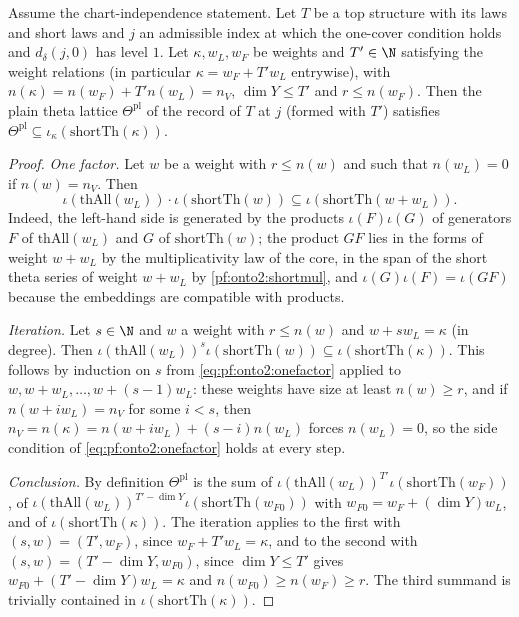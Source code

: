 \begin{proposition}\label{pf:onto2:prodshort}
Assume the chart-independence statement. Let $T$ be a top structure with its laws and short laws and $j$ an admissible index at
which the one-cover condition holds and $d_\delta(j,0)$ has level $1$. Let $\kappa,w_L,w_F$ be weights and $T'\in\N$ satisfying the weight relations (in particular
$\kappa=w_F+T'w_L$ entrywise), with $n(\kappa)=n(w_F)+T'n(w_L)=n_V$, $\dim Y\le T'$ and $r\le n(w_F)$. Then the plain theta lattice
$\Theta^{\mathrm{pl}}$ of the record of $T$ at $j$ (formed with $T'$) satisfies $\Theta^{\mathrm{pl}}\subseteq\iota_\kappa(\mathrm{shortTh}(\kappa))$.
\end{proposition}

\begin{proof}
\emph{One factor.} Let $w$ be a weight with $r\le n(w)$ and such that $n(w_L)=0$ if $n(w)=n_V$. Then
\begin{equation}\label{eq:pf:onto2:onefactor}
\iota(\mathrm{thAll}(w_L))\cdot\iota(\mathrm{shortTh}(w))\subseteq\iota(\mathrm{shortTh}(w+w_L)).
\end{equation}
Indeed, the left-hand side is generated by the products $\iota(F)\iota(G)$ of generators $F$ of $\mathrm{thAll}(w_L)$ and $G$ of
$\mathrm{shortTh}(w)$; the product $GF$ lies in the forms of weight $w+w_L$ by the multiplicativity law of the core, in the span of
the short theta series of weight $w+w_L$ by \cref{pf:onto2:shortmul}, and $\iota(G)\iota(F)=\iota(GF)$ because the embeddings are
compatible with products.

\emph{Iteration.} Let $s\in\N$ and $w$ a weight with $r\le n(w)$ and $w+sw_L=\kappa$ (in degree). Then
$\iota(\mathrm{thAll}(w_L))^s\iota(\mathrm{shortTh}(w))\subseteq\iota(\mathrm{shortTh}(\kappa))$. This follows by induction on $s$
from \eqref{eq:pf:onto2:onefactor} applied to $w,w+w_L,\dots,w+(s-1)w_L$: these weights have size at least $n(w)\ge r$, and if
$n(w+iw_L)=n_V$ for some $i<s$, then $n_V=n(\kappa)=n(w+iw_L)+(s-i)n(w_L)$ forces $n(w_L)=0$, so the side condition of
\eqref{eq:pf:onto2:onefactor} holds at every step.

\emph{Conclusion.} By definition $\Theta^{\mathrm{pl}}$ is the sum of
$\iota(\mathrm{thAll}(w_L))^{T'}\iota(\mathrm{shortTh}(w_F))$, of $\iota(\mathrm{thAll}(w_L))^{T'-\dim Y}\iota(\mathrm{shortTh}(w_{F0}))$ with
$w_{F0}=w_F+(\dim Y)w_L$, and of $\iota(\mathrm{shortTh}(\kappa))$. The iteration applies to the first with $(s,w)=(T',w_F)$, since
$w_F+T'w_L=\kappa$, and to the second with $(s,w)=(T'-\dim Y,w_{F0})$, since $\dim Y\le T'$ gives $w_{F0}+(T'-\dim Y)w_L=\kappa$ and
$n(w_{F0})\ge n(w_F)\ge r$. The third summand is trivially contained in $\iota(\mathrm{shortTh}(\kappa))$.
\end{proof}

